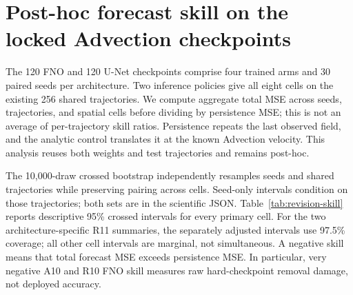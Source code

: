 \documentclass{article}
\begin{document}
\begin{table}[H]\centering\scriptsize
\caption{Conserving-RMSE removal harm in each dataset's field units. Magnitudes cannot be
compared directly between Advection and shallow water. The complete mean/median/IQR/min/max
summaries for all eight cells, both RMSE metrics, and all resolutions/horizons are in the
accompanying scientific data view.}
\resizebox{\linewidth}{!}{}
\end{table}

\section{Post-hoc forecast skill on the locked Advection checkpoints}
\label{app:revision-skill}

The 120 FNO and 120 U-Net checkpoints comprise four trained arms and 30 paired seeds per
architecture. Two inference policies give all eight cells on the existing 256 shared trajectories.
We compute aggregate total MSE across seeds, trajectories, and spatial cells before dividing by
persistence MSE; this is not an average of per-trajectory skill ratios. Persistence repeats the
last observed field, and the analytic control translates it at the known Advection velocity.
This analysis reuses both weights and test trajectories and remains post-hoc.

The 10,000-draw crossed bootstrap independently resamples seeds and shared trajectories while
preserving pairing across cells. Seed-only intervals condition on those trajectories; both sets
are in the scientific JSON. Table~\ref{tab:revision-skill} reports descriptive 95\% crossed
intervals for every primary cell. For the two architecture-specific R11 summaries, the separately
adjusted intervals use 97.5\% coverage; all other cell intervals are marginal, not simultaneous.
A negative skill means that total forecast MSE exceeds persistence MSE. In particular, very
negative A10 and R10 FNO skill measures raw hard-checkpoint removal damage, not deployed accuracy.

\begin{table}[H]
\centering\small
\caption{Post-hoc total-MSE skill at OOD-512/horizon-16. The original conserving-RMSE cube and
its registered gate remain unchanged. A/R denote absolute/residual outputs; the two digits
indicate training and inference projection.}
\label{tab:revision-skill}

\end{table}
\end{document}
